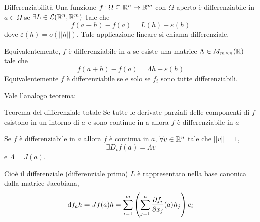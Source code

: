 \documentclass[a4paper]{article}
\begin{document}
\begin{radioactive}
\begin{snippetdefinition}{Differenziabilità}
    Una funzione \(f\colon \Omega \subseteq \mathbb{R}^n \to \mathbb{R}^m\) con \(\Omega\)
    aperto è differenziabile in \(a\in \Omega\) se \(\exists L \in \mathcal{L}(\mathbb{R}^n, \mathbb{R}^m)\)
    tale che
    \[
        f(a+h) - f(a) = L(h) + \varepsilon(h)
    \]
    dove \(\varepsilon(h) = o(||h||)\).
    Tale applicazione lineare si chiama differenziale.
\end{snippetdefinition}

Equivalentemente, \(f\) è differenziabile
in \(a\) se esiste una matrice \(\Lambda \in M_{m\times n}(\mathbb{R})\)
tale che \[ f(a+h) - f(a) = \Lambda h + \varepsilon(h) \]
Equivalentemente \(f\) è differenziabile se e solo se \(f_i\) sono tutte differenziabili.
\end{radioactive}

Vale l'analogo teorema:
\begin{radioactive}
\begin{snippettheorem}{Teorema del differenziale totale}
    Se tutte le derivate parziali delle componenti di \(f\)
    esistono in un intorno di \(a\) e sono continue in a allora \(f\) è differenziabile in \(a\)
\end{snippettheorem}

\begin{snippettheorem}{}
    Se \(f\) è differenziabile in \(a\) allora \(f\) è continua
    in \(a\), \(\forall v \in \mathbb{R}^n\) tale che \(||v|| = 1\),
    \[
        \exists D_vf(a) = \Lambda v
    \]
    e \(\Lambda = J(a)\).
\end{snippettheorem}
Cioè il differenziale (differenziale primo) \(L\) è rappresentato nella base canonica dalla matrice Jacobiana,
\[
    \text{d}f_a h = J f(a) h = \sum_{i=1}^m \left(
        \sum_{j=1}^n \frac{\partial f_i}{\partial x_j}(a)h_j
    \right)e_i
\]
\end{radioactive}
\end{document}
